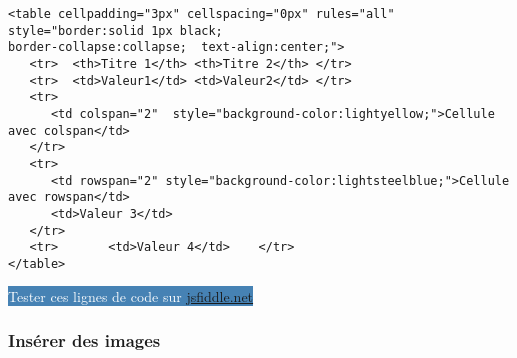 \documentclass[10pt,dvipsnames, dvips, svgnames]{article}
\begin{document}
\begin{minipage}[t]{\linewidth}
\begin{lstlisting}
<table cellpadding="3px" cellspacing="0px" rules="all" style="border:solid 1px black;
border-collapse:collapse;  text-align:center;"> 
   <tr>  <th>Titre 1</th> <th>Titre 2</th> </tr> 
   <tr>  <td>Valeur1</td> <td>Valeur2</td> </tr> 
   <tr> 
      <td colspan="2"  style="background-color:lightyellow;">Cellule avec colspan</td> 
   </tr> 
   <tr> 
      <td rowspan="2" style="background-color:lightsteelblue;">Cellule avec rowspan</td> 
      <td>Valeur 3</td> 
   </tr> 
   <tr>       <td>Valeur 4</td>    </tr> 
</table> 
\end{lstlisting}
\end{minipage}

\hypersetup{urlcolor=white}
\colorbox{SteelBlue}{\textcolor{white}{Tester ces lignes de code sur \href{https://jsfiddle.net/}{jsfiddle.net}}}
\hypersetup{urlcolor=blue}

\subsubsection{Insérer des images}

%
\end{document}

